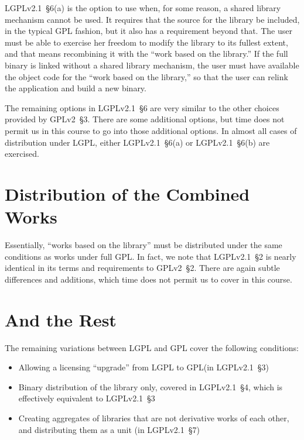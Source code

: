 LGPLv2.1~\S6(a) is the option to use when, for some reason, a shared library
mechanism cannot be used. It requires that the source for the library be
included, in the typical GPL fashion, but it also has a requirement beyond
that. The user must be able to exercise her freedom to modify the library
to its fullest extent, and that means recombining it with the ``work based
on the library.''  If the full binary is linked without a shared library
mechanism, the user must have available the object code for the ``work
based on the library,'' so that the user can relink the application and
build a new binary.

The remaining options in LGPLv2.1~\S6 are very similar to the other choices
provided by GPLv2~\S3. There are some additional options, but time does
not permit us in this course to go into those additional options. In
almost all cases of distribution under LGPL, either LGPLv2.1~\S6(a) or LGPLv2.1~\S6(b) are
exercised.

\section{Distribution of the Combined Works}

Essentially, ``works based on the library'' must be distributed under the
same conditions as works under full GPL\@. In fact, we note that 
LGPLv2.1~\S2 is nearly identical in its terms and requirements to GPLv2~\S2.
There are again subtle differences and additions, which time does not
permit us to cover in this course.

\section{And the Rest}

The remaining variations between LGPL and GPL cover the following
conditions:

\begin{itemize}

\item Allowing a licensing ``upgrade'' from LGPL to GPL\@ (in LGPLv2.1~\S3)

\item Binary distribution of the library only, covered in LGPLv2.1~\S4,
  which is effectively equivalent to LGPLv2.1~\S3

\item Creating aggregates of libraries that are not derivative works of
  each other, and distributing them as a unit (in LGPLv2.1~\S7)

\end{itemize}


